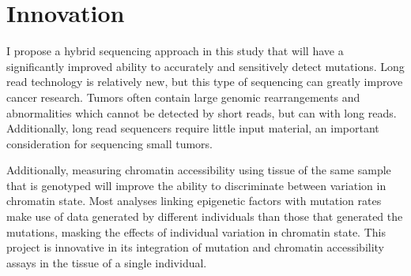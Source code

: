 % 






\section{Innovation}

I propose a hybrid sequencing approach in this study that will have a significantly improved ability to accurately and sensitively detect mutations. Long read technology is relatively new, but this type of sequencing can greatly improve cancer research. Tumors often contain large genomic rearrangements and abnormalities which cannot be detected by short reads, but can with long reads. Additionally, long read sequencers require little input material, an important consideration for sequencing small tumors.

Additionally, measuring chromatin accessibility using tissue of the same sample that is genotyped will improve the ability to discriminate between variation in chromatin state.
Most analyses linking epigenetic factors with mutation rates make use of data generated by different individuals than those that generated the mutations, masking the effects of individual variation in chromatin state. This project is innovative in its integration of mutation and chromatin accessibility assays in the tissue of a single individual.



